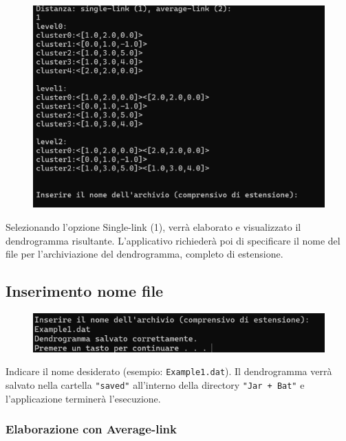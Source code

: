 \begin{figure}[h!]
    \centering
    \includegraphics[width=\textwidth]{images/scelta_singleLink.png}
\end{figure}

Selezionando l'opzione Single-link (1), verrà elaborato e visualizzato il dendrogramma risultante. L'applicativo richiederà poi di specificare il nome del file per l'archiviazione del dendrogramma, completo di estensione.

\subsection{Inserimento nome file}

\begin{figure}[h!]
    \centering
    \includegraphics[width=\textwidth]{images/inserimento_nome_file.png}
\end{figure}

Indicare il nome desiderato (esempio: \texttt{Example1.dat}). Il dendrogramma verrà salvato nella cartella \texttt{"saved"} all'interno della directory \texttt{"Jar + Bat"} e l'applicazione terminerà l'esecuzione.

\subsubsection{Elaborazione con Average-link}

